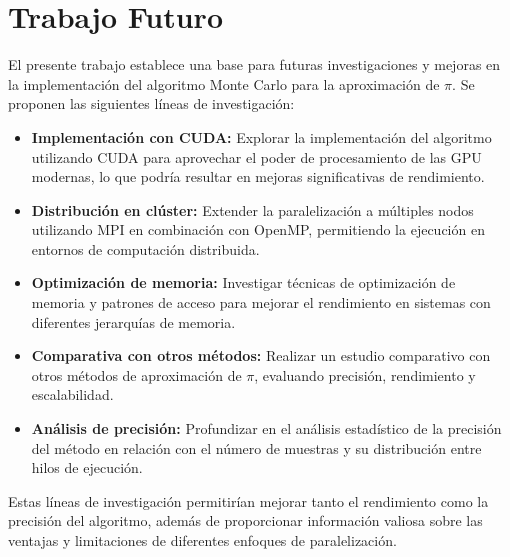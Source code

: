 \documentclass[a4paper, 10pt, onecolumn]{IEEEtran}
\begin{document}
\section{Trabajo Futuro}

El presente trabajo establece una base para futuras investigaciones y mejoras en la implementación del algoritmo Monte Carlo para la aproximación de $\pi$. Se proponen las siguientes líneas de investigación:

\begin{itemize}
  \item \textbf{Implementación con CUDA:} Explorar la implementación del algoritmo utilizando CUDA para aprovechar el poder de procesamiento de las GPU modernas, lo que podría resultar en mejoras significativas de rendimiento.
  
  \item \textbf{Distribución en clúster:} Extender la paralelización a múltiples nodos utilizando MPI \cite{mpi} en combinación con OpenMP, permitiendo la ejecución en entornos de computación distribuida.
  
  \item \textbf{Optimización de memoria:} Investigar técnicas de optimización de memoria y patrones de acceso para mejorar el rendimiento en sistemas con diferentes jerarquías de memoria.
  
  \item \textbf{Comparativa con otros métodos:} Realizar un estudio comparativo con otros métodos de aproximación de $\pi$, evaluando precisión, rendimiento y escalabilidad.
  
  \item \textbf{Análisis de precisión:} Profundizar en el análisis estadístico de la precisión del método en relación con el número de muestras y su distribución entre hilos de ejecución.
\end{itemize}

Estas líneas de investigación permitirían mejorar tanto el rendimiento como la precisión del algoritmo, además de proporcionar información valiosa sobre las ventajas y limitaciones de diferentes enfoques de paralelización.
\end{document}

